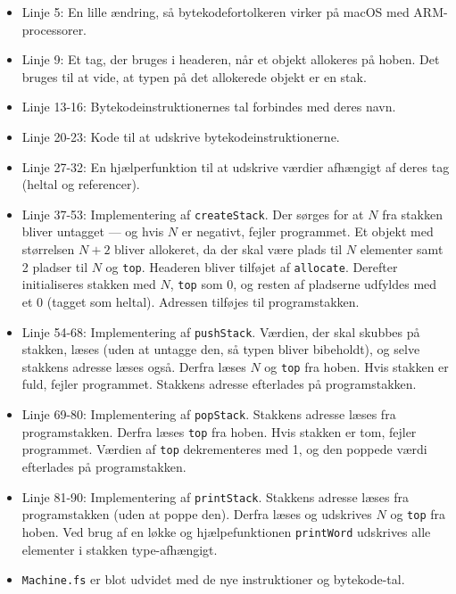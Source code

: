 \begin{itemize}
    \item Linje 5: En lille ændring, så bytekodefortolkeren virker på macOS med ARM-processorer.
    \item Linje 9: Et tag, der bruges i headeren, når et objekt allokeres på hoben. Det bruges til at vide, at typen på det allokerede objekt er en stak.
    \item Linje 13-16: Bytekodeinstruktionernes tal forbindes med deres navn.
    \item Linje 20-23: Kode til at udskrive bytekodeinstruktionerne.
    \item Linje 27-32: En hjælperfunktion til at udskrive værdier afhængigt af deres tag (heltal og referencer).
    \item Linje 37-53: Implementering af \texttt{createStack}. Der sørges for at $N$ fra stakken bliver untagget --- og hvis $N$ er negativt, fejler programmet. Et objekt med størrelsen $N + 2$ bliver allokeret, da der skal være plads til $N$ elementer samt 2 pladser til $N$ og \texttt{top}. Headeren bliver tilføjet af \texttt{allocate}. Derefter initialiseres stakken med $N$, \texttt{top} som 0, og resten af pladserne udfyldes med et 0 (tagget som heltal). Adressen tilføjes til programstakken.
    \item Linje 54-68: Implementering af \texttt{pushStack}. Værdien, der skal skubbes på stakken, læses (uden at untagge den, så typen bliver bibeholdt), og selve stakkens adresse læses også. Derfra læses $N$ og \texttt{top} fra hoben. Hvis stakken er fuld, fejler programmet. Stakkens adresse efterlades på programstakken.
    \item Linje 69-80: Implementering af \texttt{popStack}. Stakkens adresse læses fra programstakken. Derfra læses \texttt{top} fra hoben. Hvis stakken er tom, fejler programmet. Værdien af \texttt{top} dekrementeres med 1, og den poppede værdi efterlades på programstakken.
    \item Linje 81-90: Implementering af \texttt{printStack}. Stakkens adresse læses fra programstakken (uden at poppe den). Derfra læses og udskrives $N$ og \texttt{top} fra hoben. Ved brug af en løkke og hjælpefunktionen \texttt{printWord} udskrives alle elementer i stakken type-afhængigt.
    \item \texttt{Machine.fs} er blot udvidet med de nye instruktioner og bytekode-tal.
\end{itemize}

